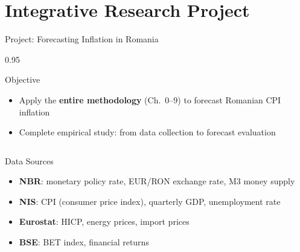 \documentclass[9pt, aspectratio=169, t]{beamer}
\begin{document}
\section{Integrative Research Project}

\begin{frame}{Project: Forecasting Inflation in Romania}
    \begin{cminipage}{0.95\textwidth}
        \begin{block}{Objective}
            \begin{itemize}\setlength{\itemsep}{0pt}
                \item Apply the \textbf{entire methodology} (Ch.\ 0--9) to forecast Romanian CPI inflation
                \item Complete empirical study: from data collection to forecast evaluation
            \end{itemize}
        \end{block}

        \vspace{0.2cm}

        {\footnotesize
        \begin{columns}[T]
            \begin{exampleblock}{Data Sources}
                \begin{itemize}\setlength{\itemsep}{0pt}
                    \item \textbf{NBR}: monetary policy rate, EUR/RON exchange rate, M3 money supply
                    \item \textbf{NIS}: CPI (consumer price index), quarterly GDP, unemployment rate
                    \item \textbf{Eurostat}: HICP, energy prices, import prices
                    \item \textbf{BSE}: BET index, financial returns
                \end{itemize}
            \end{exampleblock}


\end{columns}}
\end{cminipage}
\end{frame}
\end{document}
